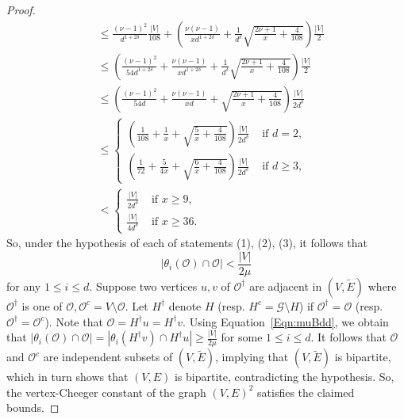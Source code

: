 \documentclass[10pt]{article}
\theoremstyle{definition}
\newcommand{\calG}{\ensuremath{\mathcal{G}}}
\newcommand{\calO}{\ensuremath{\mathcal{O}}}
\begin{document}
\begin{proof}
\begin{align*}
& \leq \frac{(\nu -1)^2}{d^{1 + 2\delta}} \frac{|V|}{108} + \left(\frac {\nu(\nu -1)}{xd^{1 + 2\delta}} + \frac 1 {d^{\delta}}\sqrt{\frac{ 2\nu + 1 }{x}
+
\frac{4}{108}
}\right) \frac{|V|}{2} \\
& \leq \left(\frac{(\nu -1)^2}{54 d^{1 + 2\delta}} + \frac {\nu(\nu -1)}{xd^{1 + 2\delta}} + \frac 1 {d^{\delta}}\sqrt{\frac{ 2\nu + 1 }{x}
+
\frac{4}{108}
}\right) \frac{|V|}{2} \\
& \leq \left(\frac{(\nu -1)^2}{54 d} + \frac {\nu(\nu -1)}{xd} + \sqrt{\frac{ 2\nu + 1 }{x}
+
\frac{4}{108}
}\right) \frac{|V|}{2d^{\delta}} \\
& 
\leq 
\begin{cases}
\left(\frac 1{108}+ \frac {1}{x} + \sqrt{\frac{ 5 }{x}
+
\frac{4}{108}
}\right) \frac{|V|}{2 d^{\delta}} 
& \text{ if } d =2, \\
\left(\frac 1{72} + \frac {5}{4x} + \sqrt{\frac{6}{x}
+
\frac{4}{108}
}\right) \frac{|V|}{2 d^{\delta}} 
& \text{ if } d \geq 3, 
\end{cases}
\\
& 
<
\begin{cases}
 \frac{|V|}{2d^{\delta}} 
& \text{ if } x \geq 9, \\
\frac{|V|}{4d^{\delta}} 
& \text{ if } x \geq 36.
\end{cases}
\end{align*}
So, under the hypothesis of each of statements (1), (2), (3), it follows that 
$$
|\theta_i(\calO)\cap \calO|
< \frac{|V|}{2\mu}
$$
for any $1\leq i \leq d$. Suppose two vertices $u, v$ of $\calO^\dag$ are adjacent in $(V, \widetilde E)$ where $\calO^\dag$ is one of $\calO, \calO^c = V \setminus \calO$. Let $H^\dag$ denote $H$ (resp. $H^c = \calG \setminus H$) if $\calO^\dag  = \calO$ (resp.~$\calO^\dag = \calO^c$). Note that $\calO = H^\dag u = H^\dag v$. Using Equation~\eqref{Eqn:muBdd}, we obtain that 
$
|\theta_i(\calO)\cap \calO|
 = |\theta_i(H^\dag v) \cap H^\dag u | 
 \geq \frac{|V|}{2\mu}
$
for some $1\leq i \leq d$. It follows that $\calO$ and $\calO^c$ are independent subsets of $(V, \widetilde E)$, implying that $(V, \widetilde E)$ is bipartite, which in turn shows that $(V, E)$ is bipartite, contradicting the hypothesis. So, the vertex-Cheeger constant of the graph $(V, E)^2$ satisfies the claimed bounds. 
\end{proof}
\end{document}
